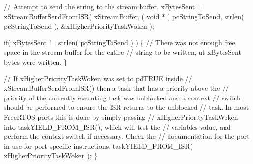 \begin{DoxyPre}    // Attempt to send the string to the stream buffer.
    xBytesSent = xStreamBufferSendFromISR( xStreamBuffer,
                                           ( void * ) pcStringToSend,
                                           strlen( pcStringToSend ),
                                           \&xHigherPriorityTaskWoken );\end{DoxyPre}



\begin{DoxyPre}    if( xBytesSent != strlen( pcStringToSend ) )
    \{
        // There was not enough free space in the stream buffer for the entire
        // string to be written, ut xBytesSent bytes were written.
    \}\end{DoxyPre}



\begin{DoxyPre}    // If xHigherPriorityTaskWoken was set to pdTRUE inside
    // xStreamBufferSendFromISR() then a task that has a priority above the
    // priority of the currently executing task was unblocked and a context
    // switch should be performed to ensure the ISR returns to the unblocked
    // task.  In most FreeRTOS ports this is done by simply passing
    // xHigherPriorityTaskWoken into taskYIELD\_FROM\_ISR(), which will test the
    // variables value, and perform the context switch if necessary.  Check the
    // documentation for the port in use for port specific instructions.
    taskYIELD\_FROM\_ISR( xHigherPriorityTaskWoken );
\}
\end{DoxyPre}
 